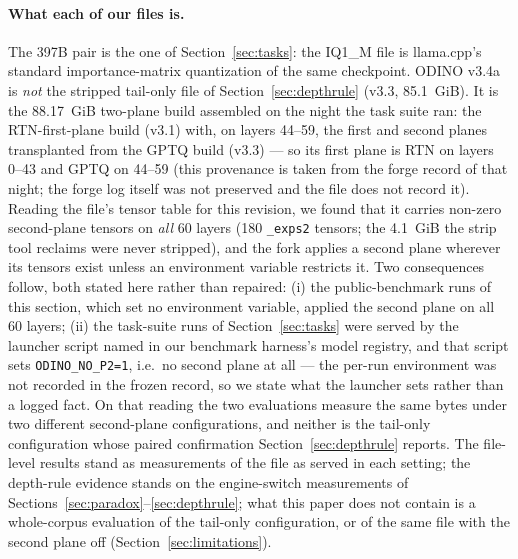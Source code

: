 \documentclass[10pt]{article} %
\begin{document}
\paragraph{What each of our files is.} The 397B pair is the one of
Section~\ref{sec:tasks}: the IQ1\_M file is llama.cpp's standard
importance-matrix quantization \citep{ikawrakow2024iq1m,ikawrakow2024imatrix}
of the same checkpoint. ODINO v3.4a is \emph{not} the stripped tail-only file
of Section~\ref{sec:depthrule} (v3.3, 85.1~GiB). It is the 88.17~GiB two-plane
build assembled on the night the task suite ran: the RTN-first-plane build
(v3.1) with, on layers 44--59, the first and second planes transplanted from
the GPTQ build (v3.3) --- so its first plane is RTN on layers 0--43 and GPTQ on
44--59 (this provenance is taken from the forge record of that night; the
forge log itself was not preserved and the file does not record it). Reading
the file's tensor table for this revision, we found that it carries non-zero
second-plane tensors on \emph{all} 60 layers (180 \texttt{\_exps2} tensors; the
4.1~GiB the strip tool reclaims were never stripped), and the fork applies a
second plane wherever its tensors exist unless an environment variable
restricts it. Two consequences follow, both stated here rather than repaired:
(i) the public-benchmark runs of this section, which set no environment
variable, applied the second plane on all 60 layers; (ii) the task-suite runs
of Section~\ref{sec:tasks} were served by the launcher script named in our
benchmark harness's model registry, and that script sets
\texttt{ODINO\_NO\_P2=1}, i.e.\ no second plane at all --- the per-run
environment was not recorded in the frozen record, so we state what the
launcher sets rather than a logged fact. On that reading the two evaluations
measure the same bytes under two different second-plane
configurations, and neither is the tail-only configuration whose paired
confirmation Section~\ref{sec:depthrule} reports. The file-level results
stand as measurements of the file as served in each setting; the depth-rule
evidence stands on the engine-switch measurements of
Sections~\ref{sec:paradox}--\ref{sec:depthrule}; what this paper does not
contain is a whole-corpus evaluation of the tail-only configuration, or of the
same file with the second plane off (Section~\ref{sec:limitations}).
\end{document}
